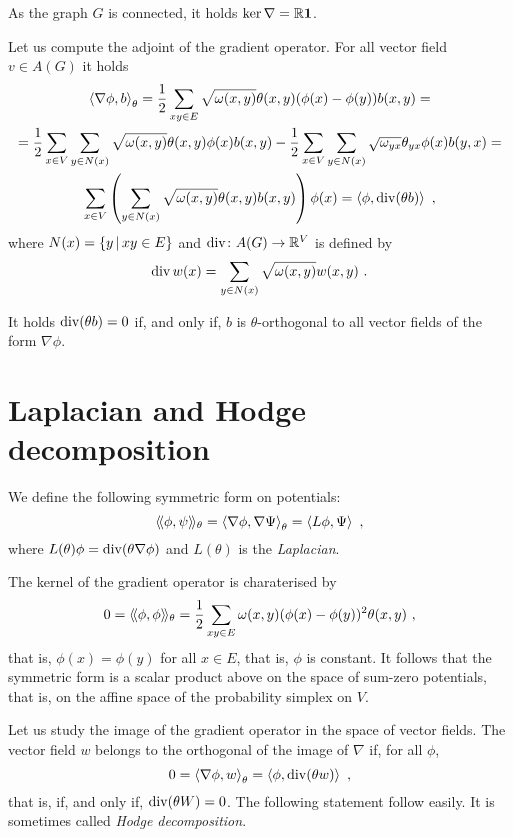 \documentclass[12pt,a4paper]{amsart}
\begin{document}
As the graph $G$ is connected, it holds $\ker \nabla = \mathbb{R} \bm 1$.

Let us compute the adjoint of the gradient operator. For all vector field $v \in A(G)$ it holds
\begin{multline*}
  \left\langle\nabla \phi,b\right\rangle_{\theta}  = \frac12 \sum_{xy \in E}
  \sqrt{\omega(x,y)} \theta(x,y) (\phi(x) - \phi(y)) b(x,y) = \\
  = \frac12 \sum_{x \in V} \sum_{y \in N(x)} \sqrt{\omega(x,y)}
  \theta(x,y) \phi(x)
b(x,y) - \frac12 \sum_{x \in V} \sum_{y \in N(x)}
  \sqrt{\omega_{yx}}  \theta_{yx} \phi(x) b(y,x) = \\ \sum_{x \in V} \left(\sum_{y \in N(x)} \sqrt{\omega(x,y)}  \theta(x,y) b(x,y) \right) \phi(x) =
  \left\langle\phi,\operatorname*{div}(\theta b)\right\rangle \ ,
\end{multline*}
where $N(x) = \left\{y \, \middle| \, xy \in E \right\}$ and $\operatorname*{div} \colon A(G) \to \mathbb{R}^V$ is defined by
\begin{equation*}
  \operatorname*{div} w (x) = \sum_{y \in N(x)} \sqrt {\omega(x,y)} w(x,y) \ . 
\end{equation*}

It holds $\operatorname*{div}(\theta b) = 0$ if, and only if, $b$ is $\theta$-orthogonal to
all vector fields of the form  $\nabla  \phi$. 

\section{Laplacian and Hodge decomposition}
\label{sec:laplacian}

We define the following symmetric form on potentials:
\begin{equation*}
  \left\langle\!\langle\phi,\psi\right\rangle\!\rangle_{\theta} = \left\langle\nabla\phi,\nabla\Psi\right\rangle_{\theta} = \left\langle L\phi,\Psi\right\rangle \ , 
\end{equation*}
where $L(\theta) \phi = \operatorname*{div}(\theta\nabla\phi)$ and $L(\theta)$ is the
\emph{Laplacian}.

The kernel of the gradient operator is charaterised by
\begin{equation*}
  0 = \left\langle\!\langle\phi,\phi\right\rangle\!\rangle_{\theta} = \frac 12 \sum_{xy \in E} \omega(x,y)
  (\phi(x) - \phi(y))^2 \theta(x,y) \ , 
\end{equation*}
that is, $\phi(x) = \phi(y)$ for all $x \in E$, that is, $\phi$ is
constant. It follows that the symmetric form is a scalar product above
on the space of sum-zero potentials, that is, on the affine space of
the probability simplex on $V$.

Let us study the image of the gradient operator in the space of vector
fields. The vector field $w$ belongs to the  orthogonal of the image of
$\nabla$ if, for all $\phi$,
\begin{equation*}
  0 = \left\langle\nabla \phi,w\right\rangle_{\theta} = \left\langle\phi,\operatorname*{div}(\theta
    w)\right\rangle \ ,
\end{equation*}
that is, if, and only if, $\operatorname*{div}(\theta W) = 0$. The following
statement follow easily. It is sometimes called \emph{Hodge decomposition}.
\end{document}
